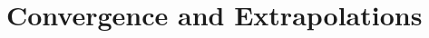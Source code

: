 \documentclass[Dissertation.tex]{subfiles}
\begin{document}





\section{Convergence and Extrapolations}
\label{sec:Extrapolations}
\end{document}
